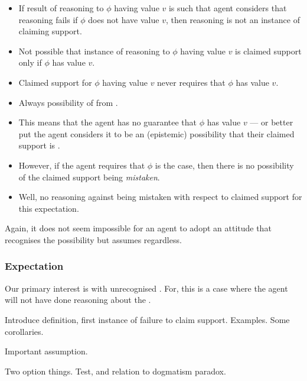   \begin{note}
  \begin{itemize}
  \item If result of reasoning to \(\phi\) having value \(v\) is such that agent considers that reasoning fails if \(\phi\) does not have value \(v\), then reasoning is not an instance of claiming support.
  \item Not possible that instance of reasoning to \(\phi\) having value \(v\) is claimed support only if \(\phi\) has value \(v\).
  \item Claimed support for \(\phi\) having value \(v\) never requires that \(\phi\) has value \(v\).
  \end{itemize}
\end{note}

\begin{note}
  \color{red}
    \begin{itemize}
    \item Always possibility of \mom{} from \nfcs{}.
    \item This means that the agent has no guarantee that \(\phi\) has value \(v\) --- or better put the agent considers it to be an (epistemic) possibility that their claimed support is \mom{}.
    \item However, if the agent requires that \(\phi\) is the case, then there is no possibility of the claimed support being \emph{mistaken}.
    \item Well, no reasoning against being mistaken with respect to claimed support for this expectation.
  \end{itemize}

  Again, it does not seem impossible for an agent to adopt an attitude that recognises the possibility but assumes regardless.
\end{note}

\subsubsection{Expectation}
\label{sec:claim-supp-expect}

\begin{note}
  Our primary interest is with unrecognised .
  For, this is a case where the agent will not have done reasoning about the \requ{}.

  Introduce definition, first instance of failure to claim support.
  Examples.
  Some corollaries.

  Important assumption.

  Two option things.
  Test, and relation to dogmatism paradox.
\end{note}

